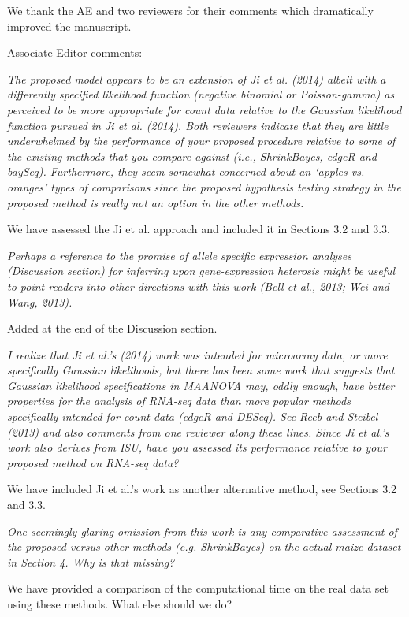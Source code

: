 \documentclass{article}
\newcommand{\comment}[1]{\textit{#1}}
\newcommand{\response}[1]{#1}
\newcommand{\todo}[1]{{\color{red} #1}}
\begin{document}
\response{We thank the AE and two reviewers for their comments which dramatically improved the manuscript.}

Associate Editor comments:

\comment{The proposed model appears to be an extension of Ji et al. (2014) albeit with a differently specified likelihood function (negative binomial or Poisson-gamma) as perceived to be more appropriate for count data relative to the Gaussian likelihood function pursued in Ji et al. (2014). Both reviewers indicate that they are little underwhelmed by the performance of your proposed procedure relative to some of the existing methods that you compare against (i.e., ShrinkBayes, edgeR and baySeq).  Furthermore, they seem somewhat concerned about an ‘apples vs. oranges’ types of comparisons since the proposed hypothesis testing strategy in the proposed method is really not an option in the other methods.}

\response{We have assessed the Ji et al. approach and included it in Sections 3.2 and 3.3.}

\comment{Perhaps a reference to the promise of allele specific expression analyses (Discussion section) for inferring upon gene-expression heterosis might be useful to point readers into other directions with this work (Bell et al., 2013; Wei and Wang, 2013).}

\response{Added at the end of the Discussion section.}

\comment{I realize that Ji et al.’s (2014) work was intended for microarray data, or more specifically Gaussian likelihoods, but there has been some work that suggests that Gaussian likelihood specifications in MAANOVA may, oddly enough, have better properties for the analysis of RNA-seq data than more popular methods specifically intended for count data (edgeR and DESeq).  See Reeb and Steibel (2013) and also comments from one reviewer along these lines.  Since Ji et al.’s work also derives from ISU, have you assessed its performance relative to your proposed method on RNA-seq data?}

\response{We have included Ji et al.'s work as another alternative method, see Sections 3.2 and 3.3.} 

\comment{One seemingly glaring omission from this work is any comparative assessment of the proposed versus other methods (e.g. ShrinkBayes) on the actual maize dataset in Section 4.  Why is that missing?}

\response{We have provided a comparison of the computational time on the real data set using these methods.} \todo{What else should we do?}
\end{document}
